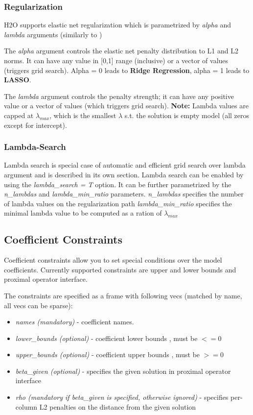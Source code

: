 \documentclass[11pt]{article}
\begin{document}
\subsubsection{Regularization}

H2O supports elastic net regularization which is parametrized by \textit{alpha} and \textit{lambda} arguments (similarly to \cite{glmnet})

The \textit{alpha} argument controls the elastic net penalty distribution to L1 and L2 norms. It can have any value in [0,1] range (inclusive) or a vector of values (triggers grid search). Alpha = 0 leads to \textbf{Ridge Regression}, alpha = 1 leads to \textbf{LASSO}.  

The \textit{lambda} argument controls the penalty strength; it can have any positive value or a vector of values (which triggers grid search).
\textbf{Note:} Lambda values are capped at $\lambda_{max}$, which is the smallest $\lambda$ s.t. the solution is empty model (all zeros except for intercept).

\subsubsection{Lambda-Search}
Lambda search is special case of automatic and efficient grid search over lambda argument and is described in its own section. Lambda search can be enabled by using the \textit{lambda\_search = T} option. It can be further parametrized by the \textit{n\_lambdas} and \textit{lambda\_min\_ratio} parameters. 
\textit{n\_lambdas} specifies the number of lambda values on the regularization path
\textit{lambda\_min\_ratio} specifies the minimal lambda value to be computed as a ration of $\lambda_{max}$

\subsection{Coefficient Constraints}
Coefficient constraints allow you to set special conditions over the model coefficients. Currently supported constraints are upper and lower bounds and proximal operator \cite{prox} interface. 

The constraints are specified as a frame with following vecs (matched by name, all vecs can be sparse):
\begin{itemize}
\item \textit{names (mandatory)}  - coefficient names. 
\item \textit{lower\_bounds (optional)} - coefficient lower bounds , must be $<= 0$
\item \textit{upper\_bounds (optional)} - coefficient upper bounds , must be $>= 0$
\item \textit{beta\_given (optional)} - specifies the given solution in proximal operator interface
\item \textit{rho (mandatory if beta\_given is specified, otherwise ignored)} - specifies per-column L2 penalties on the distance from the given solution
\end{itemize}
 
\end{document}
